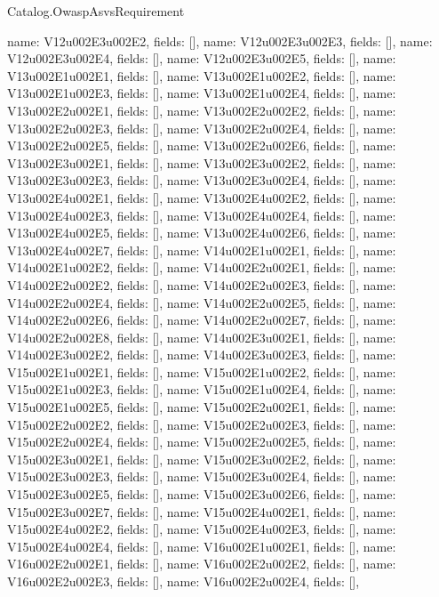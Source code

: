 \begin{lexlean}{Catalog.OwaspAsvsRequirement}
\begin{semanticmodule}
{    {name: V12u002E3u002E2, fields: []},
    {name: V12u002E3u002E3, fields: []},
    {name: V12u002E3u002E4, fields: []},
    {name: V12u002E3u002E5, fields: []},
    {name: V13u002E1u002E1, fields: []},
    {name: V13u002E1u002E2, fields: []},
    {name: V13u002E1u002E3, fields: []},
    {name: V13u002E1u002E4, fields: []},
    {name: V13u002E2u002E1, fields: []},
    {name: V13u002E2u002E2, fields: []},
    {name: V13u002E2u002E3, fields: []},
    {name: V13u002E2u002E4, fields: []},
    {name: V13u002E2u002E5, fields: []},
    {name: V13u002E2u002E6, fields: []},
    {name: V13u002E3u002E1, fields: []},
    {name: V13u002E3u002E2, fields: []},
    {name: V13u002E3u002E3, fields: []},
    {name: V13u002E3u002E4, fields: []},
    {name: V13u002E4u002E1, fields: []},
    {name: V13u002E4u002E2, fields: []},
    {name: V13u002E4u002E3, fields: []},
    {name: V13u002E4u002E4, fields: []},
    {name: V13u002E4u002E5, fields: []},
    {name: V13u002E4u002E6, fields: []},
    {name: V13u002E4u002E7, fields: []},
    {name: V14u002E1u002E1, fields: []},
    {name: V14u002E1u002E2, fields: []},
    {name: V14u002E2u002E1, fields: []},
    {name: V14u002E2u002E2, fields: []},
    {name: V14u002E2u002E3, fields: []},
    {name: V14u002E2u002E4, fields: []},
    {name: V14u002E2u002E5, fields: []},
    {name: V14u002E2u002E6, fields: []},
    {name: V14u002E2u002E7, fields: []},
    {name: V14u002E2u002E8, fields: []},
    {name: V14u002E3u002E1, fields: []},
    {name: V14u002E3u002E2, fields: []},
    {name: V14u002E3u002E3, fields: []},
    {name: V15u002E1u002E1, fields: []},
    {name: V15u002E1u002E2, fields: []},
    {name: V15u002E1u002E3, fields: []},
    {name: V15u002E1u002E4, fields: []},
    {name: V15u002E1u002E5, fields: []},
    {name: V15u002E2u002E1, fields: []},
    {name: V15u002E2u002E2, fields: []},
    {name: V15u002E2u002E3, fields: []},
    {name: V15u002E2u002E4, fields: []},
    {name: V15u002E2u002E5, fields: []},
    {name: V15u002E3u002E1, fields: []},
    {name: V15u002E3u002E2, fields: []},
    {name: V15u002E3u002E3, fields: []},
    {name: V15u002E3u002E4, fields: []},
    {name: V15u002E3u002E5, fields: []},
    {name: V15u002E3u002E6, fields: []},
    {name: V15u002E3u002E7, fields: []},
    {name: V15u002E4u002E1, fields: []},
    {name: V15u002E4u002E2, fields: []},
    {name: V15u002E4u002E3, fields: []},
    {name: V15u002E4u002E4, fields: []},
    {name: V16u002E1u002E1, fields: []},
    {name: V16u002E2u002E1, fields: []},
    {name: V16u002E2u002E2, fields: []},
    {name: V16u002E2u002E3, fields: []},
    {name: V16u002E2u002E4, fields: []},
}
\end{semanticmodule}
\end{lexlean}
